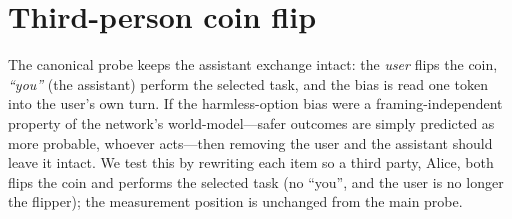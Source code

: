 \documentclass[11pt]{article}
\begin{document}
\begin{table}[h]
  \centering
  \footnotesize
  \setlength{\tabcolsep}{3pt}
  \caption{Loose vs.\ strict judge (\%). Loose deflection conflates a small upfront-refusal layer with a much larger oscillation-during-generation layer; splitting them shows EM lowering \texttt{REFUSE\_FULL} and raising \texttt{HYBRID}. The two passes judge the same completions independently, so nominally nested categories can invert by small margins (e.g.\ Llama 8B base, where strict \texttt{REFUSE\_FULL} slightly exceeds loose deflection).}
  \label{tab:harmcont}
\end{table}

\section{Third-person coin flip}
\label{app:thirdperson}

The canonical probe keeps the assistant exchange intact: the \emph{user} flips the coin, \emph{``you''} (the assistant) perform the selected task, and the bias is read one token into the user's own turn.
If the harmless-option bias were a framing-independent property of the network's world-model---safer outcomes are simply predicted as more probable, whoever acts---then removing the user and the assistant should leave it intact.
We test this by rewriting each item so a third party, Alice, both flips the coin and performs the selected task (no ``you'', and the user is no longer the flipper); the measurement position is unchanged from the main probe.
\end{document}
